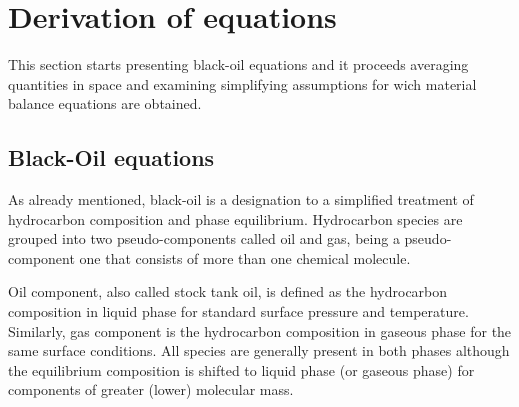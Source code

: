 \documentclass[authoryear,preprint,review,12pt]{elsarticle}
\begin{document}
%
%
%
%
%

\section{Derivation of equations}

This section starts presenting black-oil equations and it proceeds averaging quantities in space and examining simplifying assumptions for wich material balance equations are obtained.

\subsection{Black-Oil equations}

As already mentioned, black-oil is a designation to a simplified treatment of hydrocarbon composition and phase equilibrium. Hydrocarbon species are grouped into two pseudo-components called oil and gas, being a pseudo-component one that consists of more than one chemical molecule.

Oil component, also called stock tank oil, is defined as the hydrocarbon composition in liquid phase for standard surface pressure and temperature. Similarly, gas component is the hydrocarbon composition in gaseous phase for the same surface conditions. All species are generally present in both phases although the equilibrium composition is shifted to liquid phase (or gaseous phase) for components of greater (lower) molecular mass.
\end{document}
